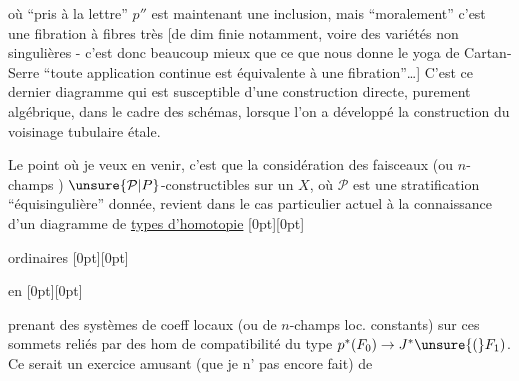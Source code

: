 %
où ``pris à la lettre'' $p''$ est maintenant une inclusion, mais ``moralement'' c'est  une fibration à fibres très  [de dim finie notamment, voire des variétés non singulières - c'est donc beaucoup mieux que ce que nous donne le yoga de Cartan-Serre ``toute application continue est équivalente à une fibration''\ldots] C'est ce dernier diagramme qui est susceptible d'une construction directe, purement algébrique, dans le cadre des schémas, lorsque l'on a développé la construction du voisinage tubulaire étale.

Le point où je veux en venir, c'est que la considération  des faisceaux (ou  $n$-champs\unsure{,} ) $\unsure{\mathcal P|P}$-constructibles sur un $X$, où $\mathcal P$ est une stratification ``équisingulière'' donnée, revient dans le cas particulier actuel à la connaissance d'un diagramme de \uline{types d'homotopie}%
\raisebox{0pt}[0pt][0pt]{\parbox{0pt}{}} ordinaires %
\raisebox{0pt}[0pt][0pt]{\parbox{0pt}{}}
en %
\raisebox{0pt}[0pt][0pt]{\parbox{0pt}{}}prenant des systèmes de coeff locaux (ou de $n$-champs loc. constants) sur ces sommets  reliés par des hom de compatibilité du type $p^*(F_0)\to J^*\unsure{(}F_1)$. Ce serait un exercice amusant (que je n' pas encore fait) de

